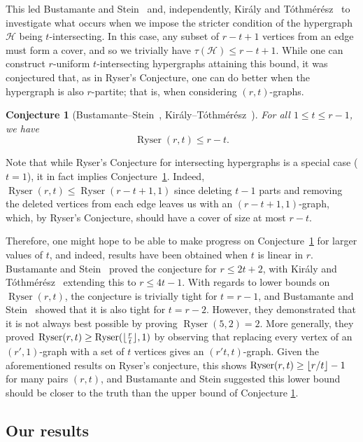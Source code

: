 \documentclass[a4paper,twoside,11pt]{article}
\DeclarePairedDelimiter{\floor}{\lfloor}{\rfloor}
\newtheorem{conj}[thm]{Conjecture}
\numberwithin{thm}{section}
\theoremstyle{definition}
\theoremstyle{remark}
\theoremstyle{definition}
\newcommand{\m}[1]{\mathcal{#1}}
\DeclareMathOperator{\Ryser}{Ryser}
\begin{document}
  This led Bustamante and Stein~\cite{bustastein}  and, independently, Kir\'aly and T\'othm\'er\'esz~\cite{kirtot}  to investigate what occurs when we impose the stricter condition of the hypergraph $\m H$ being $t$-intersecting. In this case, any subset of $r-t+1$ vertices from an edge must form a cover, and so we trivially have $\tau(\m H) \le r-t + 1$. While one can construct $r$-uniform $t$-intersecting hypergraphs attaining this bound, it was conjectured that, as in Ryser's Conjecture, one can do better when the hypergraph is also $r$-partite; that is, when considering $(r,t)$-graphs.

\begin{conj}[Bustamante--Stein~\cite{bustastein}, Kir\'aly--T\'othm\'er\'esz~\cite{kirtot}] \label{conj:weak}
For all $1 \le t \le r-1$, we have
\[\Ryser(r,t)\leq r-t.\]
\end{conj}

Note that while Ryser's Conjecture for intersecting hypergraphs is a special case ($t = 1$), it in fact implies Conjecture~\ref{conj:weak}. Indeed, $\Ryser(r, t) \leq \Ryser(r - t + 1, 1)$ since deleting $t - 1$ parts and removing the deleted vertices from each edge leaves us with an $(r - t + 1, 1)$-graph, which, by Ryser's Conjecture, should have a cover of size at most $r-t$. 

Therefore, one might hope to be able to make progress on Conjecture~\ref{conj:weak} for larger values of $t$, and indeed, results have been obtained when $t$ is linear in $r$.  Bustamante and Stein~\cite{bustastein} proved the conjecture for $r \le 2t + 2$, with Kir\'{a}ly and T\'{o}thm\'{e}r\'{e}sz~\cite{kirtot} extending this to $r \le 4t - 1$. With regards to lower bounds on $\Ryser(r,t)$, the conjecture is trivially tight for $t=r-1$, and Bustamante and Stein~\cite{bustastein} showed that it is also tight for $t=r-2$. However, they demonstrated that it is not always best possible by proving $\Ryser(5, 2) = 2$. More generally, they proved $\Ryser(r,t) \ge \Ryser(\floor{\frac{r}{t}}, 1)$ by observing that replacing every vertex of an $(r',1)$-graph with a set of $t$ vertices gives an $(r't, t)$-graph. Given the aforementioned results on Ryser's conjecture, this shows $\Ryser(r,t) \ge \floor{r/t} - 1$ for many pairs $(r,t)$, and Bustamante and Stein suggested this lower bound should be closer to the truth than the upper bound of Conjecture \ref{conj:weak}.

\subsection{Our results}
\end{document}
